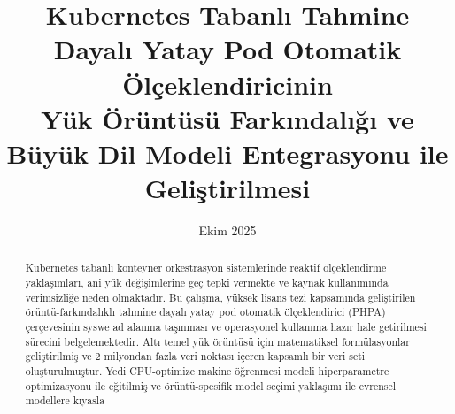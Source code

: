 \documentclass[12pt,a4paper]{article}
\title{Kubernetes Tabanlı Tahmine Dayalı Yatay Pod Otomatik Ölçeklendiricinin\\Yük Örüntüsü Farkındalığı ve Büyük Dil Modeli Entegrasyonu ile Geliştirilmesi}
\author{}
\date{Ekim 2025}
\begin{document}
\maketitle

\begin{abstract}
Kubernetes tabanlı konteyner orkestrasyon sistemlerinde reaktif ölçeklendirme yaklaşımları, ani yük değişimlerine geç tepki vermekte ve kaynak kullanımında verimsizliğe neden olmaktadır. Bu çalışma, yüksek lisans tezi kapsamında geliştirilen örüntü-farkındalıklı tahmine dayalı yatay pod otomatik ölçeklendirici (PHPA) çerçevesinin syswe ad alanına taşınması ve operasyonel kullanıma hazır hale getirilmesi sürecini belgelemektedir. Altı temel yük örüntüsü için matematiksel formülasyonlar geliştirilmiş ve 2 milyondan fazla veri noktası içeren kapsamlı bir veri seti oluşturulmuştur. Yedi CPU-optimize makine öğrenmesi modeli hiperparametre optimizasyonu ile eğitilmiş ve örüntü-spesifik model seçimi yaklaşımı ile evrensel modellere kıyasla %
\end{abstract}















\end{document}
